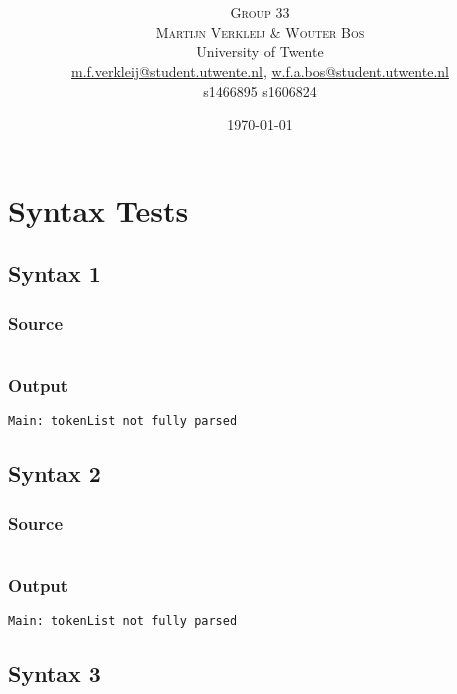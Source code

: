 \documentclass[twoside]{report}
\title{\vspace{-15mm}\fontsize{24pt}{10pt}\selectfont\textbf{\articletitle}} %
\author{
\large
\textsc{Group 33}\\[-0.75mm]
\textsc{Martijn Verkleij \& Wouter Bos}\\[2mm] %
\normalsize University of Twente \\ %
\normalsize \href{mailto:m.f.verkleij@student.utwente.nl}{m.f.verkleij@student.utwente.nl},
\href{mailto:w.f.a.bos@student.utwente.nl}{w.f.a.bos@student.utwente.nl}\\%
\normalsize s1466895 s1606824
}
\date{\today}
\begin{document}
\thispagestyle{empty}
\maketitle %



\tableofcontents


\chapter{Syntax Tests}

\section{Syntax 1}
\subsection{Source}
\inputminted[tabsize=4,linenos,firstnumber=1]{text}{../../src/haskell/PP-project-2017/test/syntax1.shl}
\subsection{Output}
\begin{verbatim}
Main: tokenList not fully parsed
\end{verbatim}

\section{Syntax 2}
\subsection{Source}
\inputminted[tabsize=4,linenos,firstnumber=1]{text}{../../src/haskell/PP-project-2017/test/syntax2.shl}
\subsection{Output}
\begin{verbatim}
Main: tokenList not fully parsed
\end{verbatim}

\section{Syntax 3}
\end{document}
